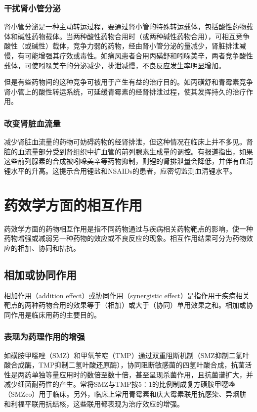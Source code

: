 \subsubsection{干扰肾小管分泌}

肾小管分泌是一种主动转运过程，要通过肾小管的特殊转运载体，包括酸性药物载体和碱性药物载体。当两种酸性药物合用时（或两种碱性药物合用），可相互竞争酸性（或碱性）载体，竞争力弱的药物，经由肾小管分泌的量减少，肾脏排泄减慢，有可能增强其疗效或毒性。如痛风患者合用丙磺舒和吲哚美辛，两者竞争酸性载体，可使吲哚美辛的分泌减少，排泄减慢，不良反应发生率明显增加。

但是有些药物间的这种竞争可被用于产生有益的治疗目的。如丙磺舒和青霉素竞争肾小管上的酸性转运系统，可延缓青霉素的经肾排泄过程，使其发挥持久的治疗作用。

\subsubsection{改变肾脏血流量}

减少肾脏血流量的药物可妨碍药物的经肾排泄，但这种情况在临床上并不多见。肾脏的血流量部分受到肾组织中扩血管的前列腺素生成量的调控。有报道指出，如果这些前列腺素的合成被吲哚美辛等药物抑制，则锂的肾排泄量会降低，并伴有血清锂水平的升高。这提示合用锂盐和NSAIDs的患者，应密切监测血清锂水平。

\section{药效学方面的相互作用}

药效学方面的药物相互作用是指不同药物通过与疾病相关药物靶点的影响，使一种药物增强或减弱另一种药物的效应或不良反应的现象。相互作用结果可分为药物效应的相加、协同和拮抗。

\subsection{相加或协同作用}

相加作用（addition effect）或协同作用（synergistic
effect）是指作用于疾病相关靶点的两种药物合用的效果等于（相加）或大于（协同）单用效果之和。相加或协同作用是临床用药的主要目的。

\subsubsection{表现为药理作用的增强}

如磺胺甲噁唑（SMZ）和甲氧苄啶（TMP）通过双重阻断机制（SMZ抑制二氢叶酸合成酶，TMP抑制二氢叶酸还原酶），协同阻断敏感菌的四氢叶酸合成，抗菌活性是两药单独等量应用时的数倍至数十倍，甚至呈现杀菌作用，且抗菌谱扩大，并减少细菌耐药性的产生。常将SMZ与TMP按5∶1的比例制成复方磺胺甲噁唑（SMZco）用于临床。另外，临床上常用青霉素和庆大霉素联用抗感染、异烟肼和利福平联用抗结核，这些联用都表现为治疗效应的增强。

